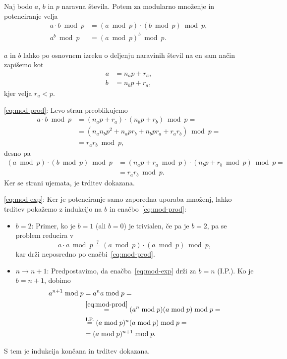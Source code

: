 \documentclass[isrm2, tisk]{fmfdelo}
\begin{document}
\begin{trditev}
    Naj bodo $a$, $b$ in $p$ naravna števila. Potem za modularno množenje in potenciranje velja
    \begin{align}
        a \cdot b \bmod p &= (a \bmod p) \cdot (b \bmod p) \bmod p, \label{eq:mod-prod} \\
        a^b \bmod p &= (a \bmod p)^b \bmod p. \label{eq:mod-exp} 
    \end{align}
\end{trditev}
\begin{dokaz}
    $a$ in $b$ lahko po osnovnem izreku o deljenju naravinih števil na en sam način zapišemo kot 
    \begin{align*}
        a &= n_a p + r_a, \\
        b &= n_b p + r_a,
    \end{align*}
    kjer velja $r_a < p$.
    
    \eqref{eq:mod-prod}: Levo stran preoblikujemo
    \begin{align*}
        a \cdot b \bmod p &= (n_a p + r_a) \cdot (n_b p + r_b) \bmod p = \\
                          &= (n_a n_b p^2 + n_a p r_b + n_b p r_a + r_a r_b) \bmod p = \\
                          &= r_a r_b \bmod p,
    \end{align*}
    desno pa
    \begin{align*}
        (a \bmod p) \cdot (b \bmod p) \bmod p &= (n_a p + r_a \bmod p) \cdot (n_b p + r_b \bmod p) \bmod p = \\
                          &= r_a r_b \bmod p.
    \end{align*}
    Ker se strani ujemata, je trditev dokazana.

    \eqref{eq:mod-exp}: Ker je potenciranje samo zaporedna uporaba množenj, lahko trditev pokažemo z 
    indukcijo na $b$ in enačbo~\eqref{eq:mod-prod}:
    \begin{itemize}
        \item $b = 2$: Primer, ko je $b = 1$ (ali $b = 0$) je trivialen, če pa je $b = 2$, pa se 
            problem reducira v 
            $$ 
            a \cdot a \bmod p \stackrel{?}{=} (a \bmod p) \cdot (a \bmod p) \bmod p,
            $$
            kar drži neposredno po enačbi~\eqref{eq:mod-prod}.
        \item $n \rightarrow n + 1$: Predpostavimo, da enačba~\eqref{eq:mod-exp} drži za $b = n$ (I.P.). 
            Ko je $b = n + 1$, dobimo 
            \begin{align*}
                a^{n + 1} \bmod p &= a^n a \bmod p = \\ 
                                  &\stackrel{\eqref{eq:mod-prod}}{=} (a^n \bmod p) (a \bmod p) \bmod p = \\
                                  &\stackrel{\text{I.P.}}{=} (a \bmod p)^n (a \bmod p) \bmod p = \\
                                  &= (a \bmod p)^{n + 1} \bmod p.
            \end{align*}
    \end{itemize}
    S tem je indukcija končana in trditev dokazana.
\end{dokaz}
\end{document}

